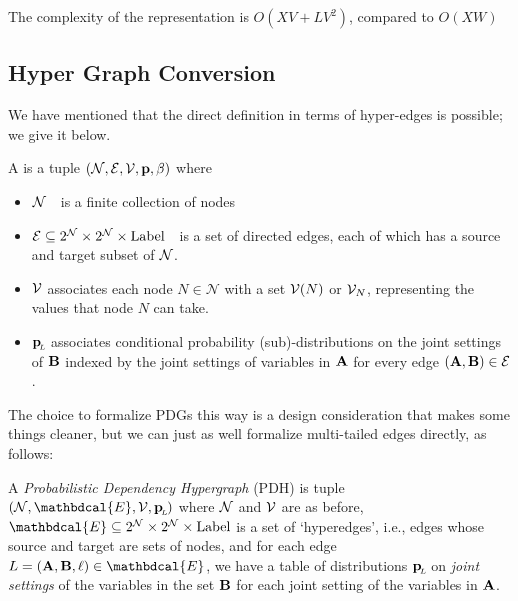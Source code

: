 {{The complexity of the representation is $O(XV + L V^2)$, compared to $O(XW)$}

\subsection{Hyper Graph Conversion}\label{sec:hyper-convert}
We have mentioned that the direct definition in terms of hyper-edges is possible; we give it below.

\begin{defn}[PDH]\label{def:hypermodel}
	A \emph{\modelnamehyper} is a tuple $\pdgvars[]$ where
	\begin{itemize}[nosep]
		\item $\N$~~is a finite collection of nodes
		\item $\Ed \subseteq 2^{\N} \times 2^{\N} \times \mathrm{Label}$~~is a set of directed edges, each of which has a source and target subset of $\N$.
		\item $\V$ associates each node $N \in \mathcal N$ with a set $\V(N)$ or $\V_N$, representing the values that node $N$ can take.
		\item $\bp$
		associates conditional probability (sub)-distributions on the joint settings of $\bf B$ indexed by the joint settings of variables in $\bf A$ for every edge $({\bf A,B}) \in \Ed$. %
	\end{itemize}
\end{defn}

	
The choice to formalize PDGs this way is a design consideration that makes some things cleaner, but we can just as well formalize multi-tailed edges directly, as follows:

\begin{defn}[PDH]\label{def:modelhyper}
A \textit{Probabilistic Dependency Hypergraph} (PDH) is tuple $(\N,
\mathbdcal{E}, \V, \bp)$ where $\N$ and $\V$ are as before, $\mathbdcal{E}
\subseteq 2^\N \times 2^\N \times \mathrm{Label}$ is a set of `hyperedges',
i.e., edges whose source and target are sets of nodes, and for each edge $L
= ({\bf A, B}, \ell) \in \mathbdcal{E}$, we have a table of distributions
$\bp$ on \emph{joint settings} of the variables in the set $\bf B$ for each
joint setting of the variables in $\bf A$.
\end{defn}

}
